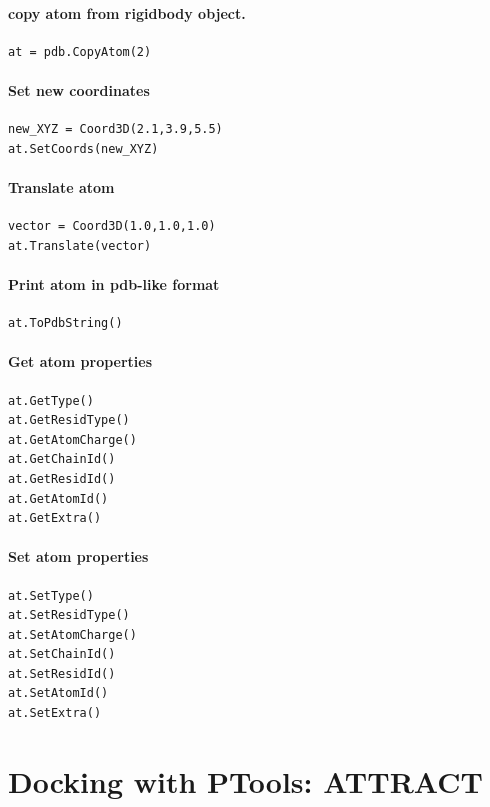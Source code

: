 \documentclass[12pt,a4paper]{article}
\begin{document}
\paragraph{copy atom from rigidbody object.}
\begin{verbatim}
at = pdb.CopyAtom(2)
\end{verbatim}

\paragraph{Set new coordinates}
\begin{verbatim}
new_XYZ = Coord3D(2.1,3.9,5.5)
at.SetCoords(new_XYZ)
\end{verbatim}

\paragraph{Translate atom}
\begin{verbatim}
vector = Coord3D(1.0,1.0,1.0)
at.Translate(vector)
\end{verbatim}


\paragraph{Print atom in pdb-like format}
\begin{verbatim}
at.ToPdbString()
\end{verbatim}

\paragraph{Get atom properties}
\begin{verbatim}
at.GetType()
at.GetResidType()
at.GetAtomCharge()
at.GetChainId()
at.GetResidId()
at.GetAtomId()
at.GetExtra()
\end{verbatim}

\paragraph{Set atom properties}
\begin{verbatim}
at.SetType()
at.SetResidType()
at.SetAtomCharge()
at.SetChainId()
at.SetResidId()
at.SetAtomId()
at.SetExtra()
\end{verbatim}

\section{Docking with PTools: ATTRACT}
\end{document}
